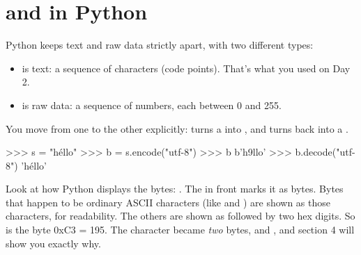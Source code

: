 \documentclass[10pt,a4paper]{article}
\begin{document}
\section{ and  in Python}
Python keeps text and raw data strictly apart, with two different types:
\begin{itemize}
\item \textbf{} is text: a sequence of characters (code points). That’s what you used on Day 2.
\item \textbf{} is raw data: a sequence of numbers, each between 0 and 255.
\end{itemize}
You move from one to the other explicitly:  turns a  into , and  turns  back into a .
\begin{txtcode}
>>> s = "héllo"
>>> b = s.encode("utf-8")
>>> b
b'h\xa9llo'
>>> b.decode("utf-8")
'héllo'
\end{txtcode}
Look at how Python displays the bytes: . The  in front marks it as bytes. Bytes that happen to be ordinary ASCII characters (like  and ) are shown as those characters, for readability. The others are shown as  followed by two hex digits. So  is the byte 0xC3 = 195. The character  became \emph{two} bytes,  and , and section 4 will show you exactly why.
\end{document}
